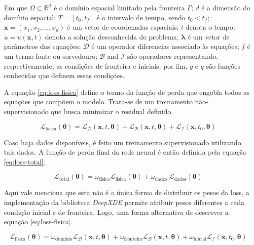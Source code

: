 Em que $\Omega \subset \mathbb{R}^d$ é o domínio espacial limitado pela 
fronteira $\Gamma$; 
$d$ é a dimensão do domínio espacial; 
$T = [t_0, t_f]$ é o intervalo de tempo, sendo $t_0 < t_f$; 
$\boldsymbol{x} = (x_1, x_2, \dots, x_d)$ é um vetor de coordenadas espaciais; 
$t$ denota o tempo; 
$u = u(\boldsymbol{x}, t)$ denota a solução desconhecida do problema; 
$\boldsymbol{\lambda}$ é um vetor de parâmetros das equações; 
$\mathcal{D}$ é um operador diferencias associado às equações; 
$f$ é um termo fonte ou sorvedouro; 
$\mathcal{B}$ and $\mathcal{I}$ são operadores representando, respectivamente,
as condições de fronteira e iniciais; 
por fim, $g$ e $q$ são funções conhecidas que definem essas condições.

A equação \ref{eq:loss-fisica} define o termo da função de perda que engobla
todos as equações que compõem o modelo. Trata-se de um treinamento 
não-supervisionado que busca minimizar o residual definido.

\begin{equation}\label{eq:loss-fisica}
    \mathcal{L}_{\text{física}}(\boldsymbol{\theta}) 
    = \mathcal{L}_{\mathcal{D}}(\boldsymbol{x},t,\boldsymbol{\theta}) 
    + \mathcal{L}_{\mathcal{B}}(\boldsymbol{x},t,\boldsymbol{\theta}) 
    + \mathcal{L}_{\mathcal{I}}(\boldsymbol{x},t_0,\boldsymbol{\theta}) 
\end{equation}

Caso haja dados disponíveis, é feito um treinamento supervisionado utilizando 
tais dados. A função de perda final da rede neural é então definida pela equação
\ref{eq:loss-total}.

\begin{equation}\label{eq:loss-total} 
    \mathcal{L}_{\text{total}}(\boldsymbol{\theta}) 
    = \omega_{\text{física}} \mathcal{L}_{\text{física}}(\boldsymbol{\theta}) 
    + \omega_{\text{dados}} \,\mathcal{L}_{\text{dados}}(\boldsymbol{\theta})
\end{equation}

Aqui vale menciona que esta não é a única forma de distribuir os pesos da loss,
a implementação da biblioteca \textit{DeepXDE} \cite{lu-etal:21-deepxde}
permite atribuir pesos diferentes a cada condição inicial e de fronteira.
Logo, uma forma alternativa de descrever a equação \ref{eq:loss-fisica}.

\begin{equation}\label{eq:loss-fisica-alternativa}
    \mathcal{L}_{\text{física}}(\boldsymbol{\theta}) 
    = \omega_{\text{domínio}}\mathcal{L}_{\mathcal{D}}(\boldsymbol{x},t,\boldsymbol{\theta}) 
    + \omega_{\text{fronteira}}\mathcal{L}_{\mathcal{B}}(\boldsymbol{x},t,\boldsymbol{\theta}) 
    + \omega_{\text{inicial}}\mathcal{L}_{\mathcal{I}}(\boldsymbol{x},t_0,\boldsymbol{\theta}) 
\end{equation}

